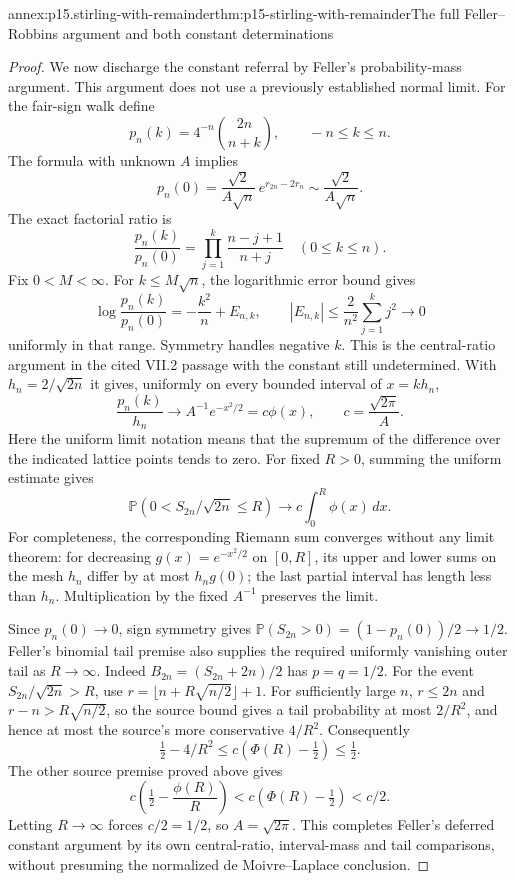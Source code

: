 \begin{annexitem}{annex:p15.stirling-with-remainder}{thm:p15-stirling-with-remainder}{The full Feller--Robbins argument and both constant determinations}
\begin{proof}
We now discharge the constant referral by Feller's
probability-mass argument. This argument does not use a
previously established normal limit.
For the fair-sign walk define
\[
 p_n(k)=4^{-n}\binom{2n}{n+k},\qquad -n\leq k\leq n.
\]
The formula with unknown \(A\) implies
\[
 p_n(0)=\frac{\sqrt2}{A\sqrt n}\,e^{r_{2n}-2r_n}
                          \sim\frac{\sqrt2}{A\sqrt n}.
\]
The exact factorial ratio is
\[
 \frac{p_n(k)}{p_n(0)}
   =\prod_{j=1}^k\frac{n-j+1}{n+j}\quad(0\leq k\leq n).
\]
Fix \(0<M<\infty\). For \(k\leq M\sqrt n\), the logarithmic
error bound gives
\[
 \log\frac{p_n(k)}{p_n(0)}
    =-\frac{k^2}{n}+E_{n,k},\qquad
 |E_{n,k}|\leq\frac2{n^2}\sum_{j=1}^k j^2
                         \longrightarrow0
\]
uniformly in that range. Symmetry handles negative \(k\).
This is the central-ratio argument in the cited VII.2
passage with the constant still undetermined.
With \(h_n=2/\sqrt{2n}\) it gives, uniformly on every
bounded interval of \(x=k h_n\),
\[
 \frac{p_n(k)}{h_n}\longrightarrow A^{-1}e^{-x^2/2}
                  =c\phi(x),\qquad c=\frac{\sqrt{2\pi}}A.
\]
Here the uniform limit notation means that the supremum
of the difference over the indicated lattice points tends
to zero.
For fixed \(R>0\), summing the uniform estimate gives
\[
 \mathbb P(0<S_{2n}/\sqrt{2n}\leq R)
       \longrightarrow c\int_0^R\phi(x)\,dx.
\]
For completeness, the corresponding Riemann sum converges
without any limit theorem: for decreasing
\(g(x)=e^{-x^2/2}\) on \([0,R]\), its upper and lower sums
on the mesh \(h_n\) differ by at most \(h_n g(0)\);
the last partial interval has length less than \(h_n\).
Multiplication by the fixed \(A^{-1}\) preserves the limit.

Since \(p_n(0)\to0\), sign symmetry gives
\(\mathbb P(S_{2n}>0)=(1-p_n(0))/2\to1/2\).
Feller's binomial tail premise also supplies the required
uniformly vanishing outer tail as \(R\to\infty\).
Indeed \(B_{2n}=(S_{2n}+2n)/2\) has \(p=q=1/2\).
For the event \(S_{2n}/\sqrt{2n}>R\), use
\(r=\lfloor n+R\sqrt{n/2}\rfloor+1\).
For sufficiently large \(n\), \(r\leq2n\) and
\(r-n>R\sqrt{n/2}\), so the source bound gives a tail
probability at most \(2/R^2\), and hence at most the
source's more conservative \(4/R^2\).
Consequently
\[
 \tfrac12-4/R^2\leq c(\Phi(R)-\tfrac12)\leq\tfrac12.
\]
The other source premise proved above gives
\[
 c\left(\tfrac12-\frac{\phi(R)}R\right)
       <c(\Phi(R)-\tfrac12)<c/2.
\]
Letting \(R\to\infty\) forces \(c/2=1/2\), so \(A=\sqrt{2\pi}\).
This completes Feller's deferred constant argument by its
own central-ratio, interval-mass and tail comparisons,
without presuming the normalized de Moivre--Laplace conclusion.


\end{proof}
\end{annexitem}
